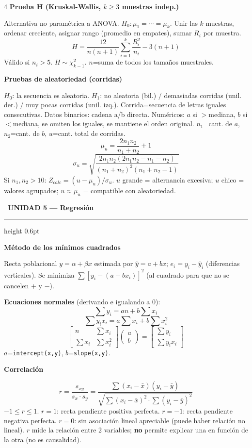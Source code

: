 \documentclass[9pt,a4paper]{article}
\newcommand{\bodysize}{\fontsize{9.2}{10.8}\selectfont}
\newcommand{\notesize}{\fontsize{7.8}{9.1}\selectfont}
\newcommand{\subsize}{\fontsize{10.5}{12.3}\selectfont\bfseries}
\newcommand{\unitsize}{\fontsize{13.5}{15.5}\selectfont\bfseries}
\newcommand{\unithead}[2]{%
  \par\vspace{2.5pt}
  \noindent\colorbox{#1!22}{\textcolor{#1!65!black}{\unitsize\ #2}}%
  \par\vspace{1.5pt}\hrule height 0.6pt \color{#1!55!black}\vspace{2pt}\color{black}%
}
\newcommand{\topic}[2]{\subsize\textcolor{#1!60!black}{#2}\par\vspace{0.5pt}\bodysize}
\begin{document}
\begin{multicols}{4}
\topic{violet}{Prueba H (Kruskal-Wallis, $k\geq3$ muestras indep.)}
Alternativa no paramétrica a ANOVA. $H_0: \mu_1=\cdots=\mu_k$. Unir las $k$ muestras, ordenar creciente, asignar rango (promedio en empates), sumar $R_i$ por muestra.
\[
H=\frac{12}{n(n+1)}\sum_{i=1}^{k}\frac{R_i^2}{n_i}-3(n+1)
\]
Válido si $n_i>5$. $H\sim\chi^2_{k-1}$. $n$=suma de todos los tamaños muestrales.

\topic{violet}{Pruebas de aleatoriedad (corridas)}
$H_0$: la secuencia es aleatoria. $H_1$: no aleatoria (bil.) / demasiadas corridas (unil. der.) / muy pocas corridas (unil. izq.). Corrida=secuencia de letras iguales consecutivas.
Datos binarios: cadena a/b directa. Numéricos: $a$ si $>$mediana, $b$ si $<$mediana, se omiten los iguales, se mantiene el orden original.
$n_1$=cant. de $a$, $n_2$=cant. de $b$, $u$=cant. total de corridas.
\[
\mu_u=\frac{2n_1n_2}{n_1+n_2}+1
\]
\[
\sigma_u=\sqrt{\frac{2n_1n_2(2n_1n_2-n_1-n_2)}{(n_1+n_2)^2(n_1+n_2-1)}}
\]
Si $n_1,n_2>10$: $Z_{calc}=(u-\mu_u)/\sigma_u$. $u$ grande = alternancia excesiva; $u$ chico = valores agrupados; $u\approx\mu_u$ = compatible con aleatoriedad.

\unithead{orange}{UNIDAD 5 --- Regresión}

\topic{orange}{Método de los mínimos cuadrados}
Recta poblacional $y=\alpha+\beta x$ estimada por $\hat{y}=a+bx$; $e_i=y_i-\hat{y}_i$ (diferencias verticales). Se minimiza $\sum[y_i-(a+bx_i)]^2$ (al cuadrado para que no se cancelen $+$ y $-$).

\textbf{Ecuaciones normales} (derivando e igualando a 0):
{\notesize
\[
\sum y_i=an+b\sum x_i
\]
\[
\sum y_ix_i=a\sum x_i+b\sum x_i^2
\]
}
{\notesize
\[
\begin{bmatrix} n & \sum x_i \\ \sum x_i & \sum x_i^2 \end{bmatrix}
\begin{pmatrix} a\\b \end{pmatrix} =
\begin{bmatrix} \sum y_i \\ \sum y_ix_i \end{bmatrix}
\]
}
$a$=\texttt{intercept(x,y)}, $b$=\texttt{slope(x,y)}.

\topic{orange}{Correlación}
\[
r=\frac{s_{xy}}{s_x\cdot s_y}=\frac{\sum(x_i-\bar{x})(y_i-\bar{y})}{\sqrt{\sum(x_i-\bar{x})^2\cdot\sum(y_i-\bar{y})^2}}
\]
$-1\leq r\leq1$. $r=1$: recta pendiente positiva perfecta. $r=-1$: recta pendiente negativa perfecta. $r=0$: sin asociación lineal apreciable (puede haber relación no lineal). $r$ mide la relación entre 2 variables; \textbf{no} permite explicar una en función de la otra (no es causalidad).


\end{multicols}
\end{document}
